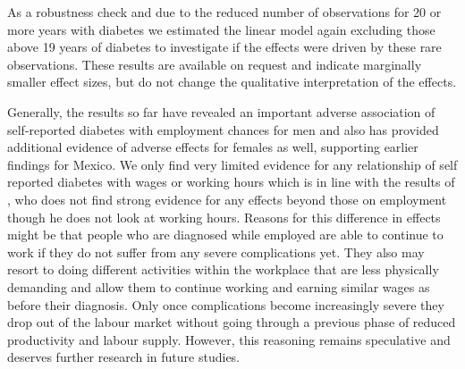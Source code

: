 As a robustness check and due to the reduced number of observations for 20 or more years with diabetes we estimated the linear model again excluding those above 19 years of diabetes to investigate if the effects were driven by these rare observations. These results are available on request and indicate marginally smaller effect sizes, but do not change the qualitative interpretation of the effects.

Generally, the results so far have revealed an important adverse association of self-reported diabetes with employment chances for men and also has provided additional evidence of adverse effects for females as well, supporting earlier findings for Mexico. We only find very limited evidence for any relationship of self reported diabetes with wages or working hours which is in line with the results of \citet{Minor2013}, who does not find strong evidence for any effects beyond those on employment though he does not look at working hours. Reasons for this difference in effects might be that people who are diagnosed while employed are able to continue to work if they do not suffer from any severe complications yet. They also may resort to doing different activities within the workplace that are less physically demanding and allow them to continue working and earning similar wages as before their diagnosis. Only once complications become increasingly severe they drop out of the labour market without going through a previous phase of reduced productivity and labour supply. However, this reasoning remains speculative and deserves further research in future studies.


